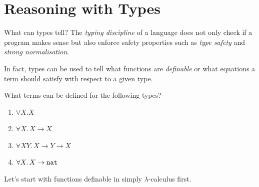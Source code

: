 \section{Reasoning with Types}

\begin{frame}{What can types tell?}
  The \emph{typing discipline} of a language does not only check if a program makes sense but also enforce safety properties such as \emph{type safety} and \emph{strong normalisation}.

  In fact, types can be used to tell what functions are \emph{definable} or what equations a term should satisfy with respect to a given type.

  What terms can be defined for the following types?
  \begin{enumerate}
    \item $\forall X. X$
    \item $\forall X.\, X \to X$
    \item $\forall X Y.\, X \to Y \to X$
    \item $\forall X.\, X \to \mathtt{nat}$
  \end{enumerate}

  Let's start with functions definable in simply $\lambda$-calculus first.
\end{frame}

